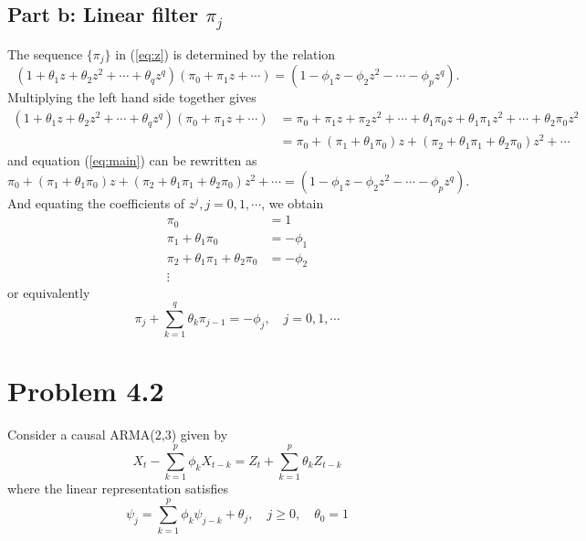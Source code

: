 \documentclass[11pt, oneside]{article}   	%
\begin{document}
\subsection{Part b: Linear filter ${\pi_{j}}$}
The sequence $\{\pi_{j}\}$ in (\ref{eq:z}) is determined by the relation
\begin{equation}\label{eq:main}
(1+\theta_{1}z +\theta_{2}z^{2} + \cdots + \theta_{q}z^{q})(\pi_{0} + \pi_{1}z + \cdots) = (1-\phi_{1}z-\phi_{2}z^{2}-\cdots-\phi_{p}z^{q}).
\end{equation}
Multiplying the left hand side together gives 
\begin{equation}
\begin{aligned}
(1+\theta_{1}z +\theta_{2}z^{2} + \cdots + \theta_{q}z^{q})(\pi_{0} + \pi_{1}z + \cdots)&=\pi_{0}+\pi_{1}z+\pi_{2}z^{2}+\cdots +\theta_{1}\pi_{0}z+\theta_{1}\pi_{1}z^{2}+\cdots+\theta_{2}\pi_{0}z^{2}\\
&=\pi_{0}+(\pi_{1}+\theta_{1}\pi_{0})z+(\pi_{2}+\theta_{1}\pi_{1}+\theta_{2}\pi_{0})z^{2}+ \cdots \nonumber
\end{aligned}
\end{equation}
and equation (\ref{eq:main}) can be rewritten as 
\begin{equation}\label{eq:main1}
\pi_{0}+(\pi_{1}+\theta_{1}\pi_{0})z+(\pi_{2}+\theta_{1}\pi_{1}+\theta_{2}\pi_{0})z^{2}+ \cdots = (1-\phi_{1}z-\phi_{2}z^{2}-\cdots-\phi_{p}z^{q}).
\end{equation}
And equating the coefficients of $z^{j}, j = 0, 1, \cdots$, we obtain
\begin{equation}
\begin{aligned}
\pi_{0} &= 1\\
\pi_{1}+\theta_{1}\pi_{0}&=-\phi_{1}\\
\pi_{2}+\theta_{1}\pi_{1}+\theta_{2}\pi_{0} &=-\phi_{2}\\
\vdots\nonumber
\end{aligned}
\end{equation}
or equivalently
\begin{equation}
\pi_{j}+\sum_{k=1}^{q}\theta_{k}\pi_{j-1} = -\phi_{j}, \quad j =0,1, \cdots
\end{equation}

\section{Problem 4.2}
Consider a causal ARMA(2,3) given by 
\begin{equation}\label{eq:arma2}
X_{t}-\sum_{k=1}^{p}\phi_{k}X_{t-k} = Z_{t}+\sum_{k=1}^{p}\theta_{k}Z_{t-k}
\end{equation}
where the linear representation satisfies 
\begin{equation}\label{eq:repr}
\psi_{j} = \sum_{k=1}^{p}\phi_{k}\psi_{j-k} + \theta_{j}, \quad j\geq 0 , \quad \theta_{0} = 1
\end{equation}
\end{document}
